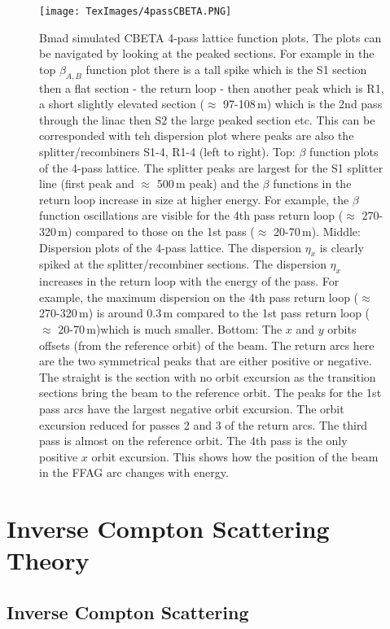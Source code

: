 \documentclass[11pt]{article}
\begin{document}
\begin{figure}[H]
\centering
\texttt{[image: TexImages/4passCBETA.PNG]}
\caption{\label{fig:4passCBETA} Bmad simulated CBETA 4-pass lattice function plots. The plots can be navigated by looking at the peaked sections. For example in the top $\beta_{A,B}$ function plot there is a tall spike which is the S1 section then a flat section - the return loop - then another peak which is R1, a short slightly elevated section ($\approx$ 97-108\,m) which is the 2nd pass through the linac then S2 the large peaked section etc. This can be corresponded with teh dispersion plot where peaks are also the splitter/recombiners S1-4, R1-4 (left to right). Top: $\beta$ function plots of the 4-pass lattice. The splitter peaks are largest for the S1 splitter line (first peak and $\approx$ 500\,m peak) and the $\beta$ functions in the return loop increase in size at higher energy. For example, the $\beta$ function oscillations are visible for the 4th pass return loop ($\approx$ 270-320\,m) compared to those on the 1st pass ($\approx$ 20-70\,m). Middle: Dispersion plots of the 4-pass lattice. The dispersion $\eta_{x}$ is clearly spiked at the splitter/recombiner sections. The dispersion $\eta_{x}$ increases in the return loop with the energy of the pass. For example, the maximum dispersion on the 4th pass return loop ($\approx$ 270-320\,m) is around 0.3\,m compared to the 1st pass return loop ($\approx$ 20-70\,m)which is much smaller. Bottom: The $x$ and $y$ orbits offsets (from the reference orbit) of the beam. The return arcs here are the two symmetrical peaks that are either positive or negative. The straight is the section with no orbit excursion as the transition sections bring the beam to the reference orbit. The peaks for the 1st pass arcs have the largest negative orbit excursion. The orbit excursion reduced for passes 2 and 3 of the return arcs. The third pass is almost on the reference orbit. The 4th pass is the only positive $x$ orbit excursion. This shows how the position of the beam in the FFAG arc changes with energy.}
\end{figure} 

\section{Inverse Compton Scattering Theory}
\subsection{Inverse Compton Scattering}
\label{sec:ICStheory}
\end{document}
